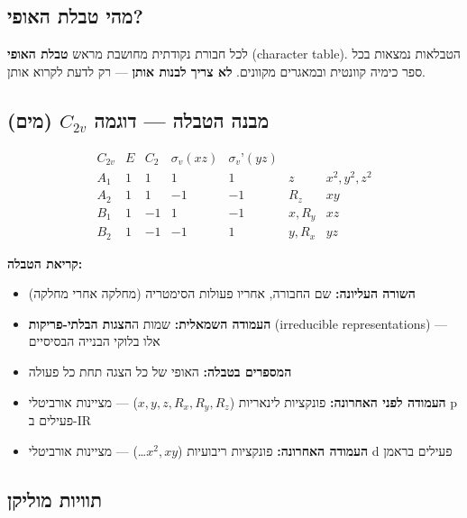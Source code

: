 \documentclass[
  hebrew,
  letterpaper,
  DIV=11,
  numbers=noendperiod]{scrreprt}
\providecommand{\tightlist}{%
  \setlength{\itemsep}{0pt}\setlength{\parskip}{0pt}}
\begin{document}
\subsection{מהי טבלת
האופי?}\label{ux5deux5d4ux5d9-ux5d8ux5d1ux5dcux5ea-ux5d4ux5d0ux5d5ux5e4ux5d9}

לכל חבורת נקודתית מחושבת מראש \textbf{טבלת האופי} (character table).
הטבלאות נמצאות בכל ספר כימיה קוונטית ובמאגרים מקוונים. \textbf{לא צריך
לבנות אותן} --- רק לדעת לקרוא אותן.

\subsection{\texorpdfstring{מבנה הטבלה --- דוגמה \(C_{2v}\)
(מים)}{מבנה הטבלה --- דוגמה C\_\{2v\} (מים)}}\label{ux5deux5d1ux5e0ux5d4-ux5d4ux5d8ux5d1ux5dcux5d4-ux5d3ux5d5ux5d2ux5deux5d4-c_2v-ux5deux5d9ux5dd}

\[\begin{array}{c|cccc|cc}
C_{2v} & E & C_2 & \sigma_v(xz) & \sigma_v’(yz) & & \\
\hline
A_1 & 1 & 1 & 1 & 1 & z & x^2, y^2, z^2 \\
A_2 & 1 & 1 & -1 & -1 & R_z & xy \\
B_1 & 1 & -1 & 1 & -1 & x, R_y & xz \\
B_2 & 1 & -1 & -1 & 1 & y, R_x & yz \
\end{array}\]

\textbf{קריאת הטבלה:}

\begin{itemize}
\tightlist
\item
  \textbf{השורה העליונה:} שם החבורה, אחריו פעולות הסימטריה (מחלקה אחרי
  מחלקה)
\item
  \textbf{העמודה השמאלית:} שמות ה\textbf{הצגות הבלתי-פריקות}
  (irreducible representations) --- אלו בלוקי הבנייה הבסיסיים
\item
  \textbf{המספרים בטבלה:} האופי של כל הצגה תחת כל פעולה
\item
  \textbf{העמודה לפני האחרונה:} פונקציות לינאריות
  (\(x, y, z, R_x, R_y, R_z\)) --- מציינות אורביטלי p פעילים ב-IR
\item
  \textbf{העמודה האחרונה:} פונקציות ריבועיות (\(x^2, xy\)\ldots) ---
  מציינות אורביטלי d פעילים בראמן
\end{itemize}

\subsection{תוויות
מוליקן}\label{ux5eaux5d5ux5d5ux5d9ux5d5ux5ea-ux5deux5d5ux5dcux5d9ux5e7ux5df}
\end{document}
